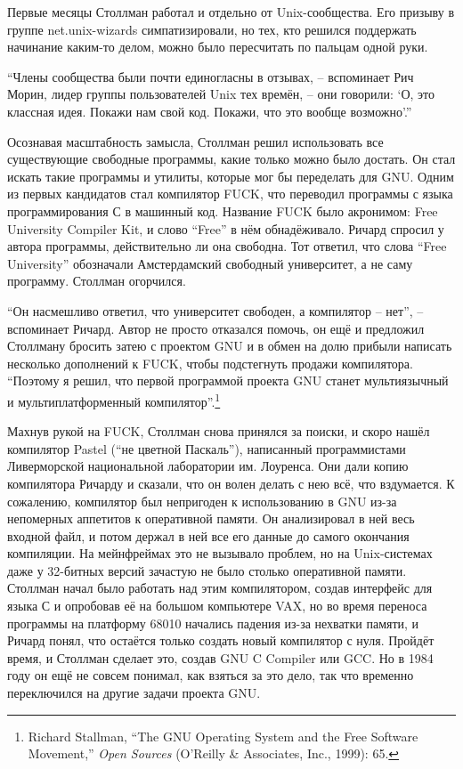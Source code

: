 Первые месяцы Столлман работал и отдельно от Unix-сообщества. Его призыву в группе net.unix-wizards симпатизировали, но тех, кто решился поддержать начинание каким-то делом, можно было пересчитать по пальцам одной руки.

\enquote{Члены сообщества были почти единогласны в отзывах, -- вспоминает Рич Морин, лидер группы пользователей Unix тех времён, -- они говорили: \enquote{О, это классная идея. Покажи нам свой код. Покажи, что это вообще возможно}.\hspace{0.01in}}

Осознавая масштабность замысла, Столлман решил использовать все существующие свободные программы, какие только можно было достать. Он стал искать такие программы и утилиты, которые мог бы переделать для GNU. Одним из первых кандидатов стал компилятор FUCK, что переводил программы с языка программирования С в машинный код. Название FUCK было акронимом: Free University Compiler Kit, и слово \enquote{Free} в нём обнадёживало. Ричард спросил у автора программы, действительно ли она свободна. Тот ответил, что слова \enquote{Free University} обозначали Амстердамский свободный университет, а не саму программу. Столлман огорчился.

\enquote{Он насмешливо ответил, что университет свободен, а компилятор -- нет}, -- вспоминает Ричард. Автор не просто отказался помочь, он ещё и предложил Столлману бросить затею с проектом GNU и в обмен на долю прибыли написать несколько дополнений к FUCK, чтобы подстегнуть продажи компилятора. \enquote{Поэтому я решил, что первой программой проекта GNU станет мультиязычный и мультиплатформенный компилятор}.\footnote{Richard Stallman, \enquote{The GNU Operating System and the Free Software Movement,} \textit{Open Sources} (O'Reilly \& Associates, Inc., 1999): 65.}

Махнув рукой на FUCK, Столлман снова принялся за поиски, и скоро нашёл компилятор Pastel (\enquote{не цветной Паскаль}), написанный программистами Ливерморской национальной лаборатории им. Лоуренса. Они дали копию компилятора Ричарду и сказали, что он волен делать с нею всё, что вздумается. К сожалению, компилятор был непригоден к использованию в GNU из-за непомерных аппетитов к оперативной памяти. Он анализировал в ней весь входной файл, и потом держал в ней все его данные до самого окончания компиляции. На мейнфреймах это не вызывало проблем, но на Unix-системах даже у 32-битных версий зачастую не было столько оперативной памяти. Столлман начал было работать над этим компилятором, создав интерфейс для языка С и опробовав её на большом компьютере VAX, но во время переноса программы на платформу 68010 начались падения из-за нехватки памяти, и Ричард понял, что остаётся только создать новый компилятор с нуля. Пройдёт время, и Столлман сделает это, создав GNU C Compiler или GCC. Но в 1984 году он ещё не совсем понимал, как взяться за это дело, так что временно переключился на другие задачи проекта GNU.

